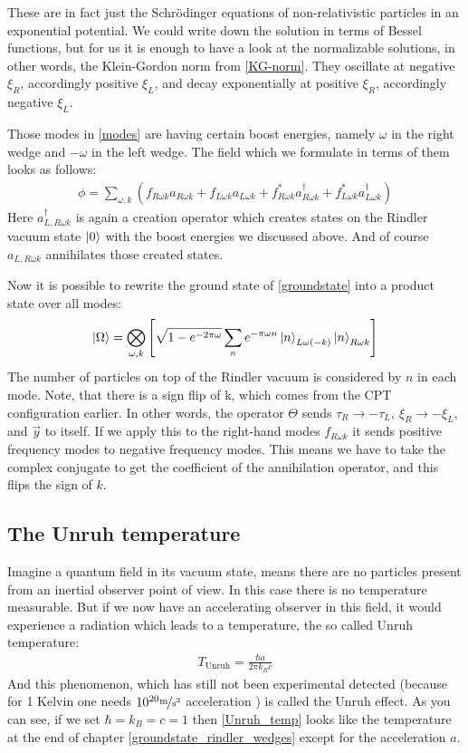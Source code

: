 	These are in fact just the Schrödinger equations of non-relativistic particles in an exponential potential. We could write down the solution in terms of Bessel functions, but for us it is enough to have a look at the normalizable solutions, in other words, the Klein-Gordon norm from \eqref{KG-norm}. They oscillate at negative $\xi_R$, accordingly positive $\xi_L$, and decay exponentially at positive $\xi_R$, accordingly negative $\xi_L$.
	
	Those modes in \eqref{modes} are having certain boost energies, namely $\omega$ in the right wedge and $-\omega$ in the left wedge. The field which we formulate in terms of them looks as follows:
	\begin{align}
		\phi = \sum_{\omega, k} 
		\left(
			f_{R\omega k} a_{R\omega k} + f_{L\omega k}a_{L\omega k} + f^*_{R\omega k} a^\dagger_{R\omega k} + f^*_{L\omega k} a^\dagger_{L\omega k}
		\right)
	\end{align}
	Here $a^\dagger_{L,R\omega k}$ is again a creation operator which creates states on the Rindler vacuum state $\ket{0}$ with the boost energies we discussed above. And of course $a_{L,R\omega k}$ annihilates those created states. 
	
	Now it is possible to rewrite the ground state of \eqref{groundstate} into a product state over all modes:
	\begin{align}
		\ket{\Omega} = \bigotimes_{\omega, k} 
		\left[
			\sqrt{1-e^{-2\pi \omega}} \sum_n e^{-\pi \omega n} \ket{n}_{L \omega (-k)} \ket{n}_{R \omega k}
		\right]
	\end{align}
	The number of particles on top of the Rindler vacuum is considered by $n$ in each mode. Note, that there is a sign flip of k, which comes from the CPT configuration earlier. In other words, the operator $\Theta$ sends $\tau_R \rightarrow -\tau_L,~ \xi_R \rightarrow -\xi_L,$ and $\vec{y}$ to itself. If we apply this to the right-hand modes $f_{R\omega k}$ it sends positive frequency modes to negative frequency modes. This means we have to take the complex conjugate to get the coefficient of the annihilation operator, and this flips the sign of $k$.
\subsection{The Unruh temperature \checkmark} \label{Unruh}
Imagine a quantum field in its vacuum state, means there are no particles present from an inertial observer point of view. In this case there is no temperature measurable. But if we now have an accelerating observer in this field, it would experience a radiation which leads to a temperature, the so called Unruh temperature:
	\begin{align} \label{Unruh_temp}
		T_{\text{Unruh}}=\frac{\hbar a}{2\pi k_B c}
	\end{align}
And this phenomenon, which has still not been experimental detected (because for 1 Kelvin one needs $10^{20} \unitfrac{m}{s^2}$ acceleration \cite{scholarUnruh}) is called the Unruh effect. As you can see, if we set $\hbar = k_B = c = 1$ then \eqref{Unruh_temp} looks like the temperature at the end of chapter \ref{groundstate_rindler_wedges} except for the acceleration $a$.  

